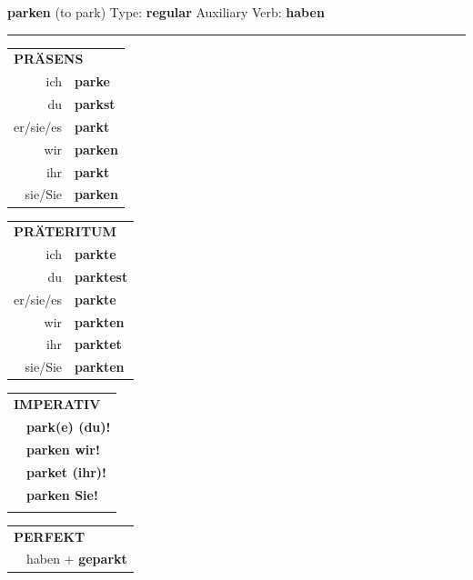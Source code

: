 \documentclass[10pt,a4paper]{revtex4-2}
\begin{document}
\begin{verbbox}
    {\Large \bf parken} (to park) \hfill Type: \textbf{regular} \hfill Auxiliary Verb: \textbf{haben} 
    
     \vspace{5pt}

    \hrule
    
    \vspace{5pt}

  \begin{tabular}{rl}
     \multicolumn{2}{l}{\textbf{PRÄSENS} }\\
    ich & \textbf{parke}\\
    du & \textbf{parkst}\\
    er/sie/es & \textbf{parkt}\\
    wir & \textbf{parken}\\
    ihr & \textbf{parkt}\\
    sie/Sie & \textbf{parken}\\
  \end{tabular}
  \hfill
     \begin{tabular}{rl}
    \multicolumn{2}{l}{\textbf{PRÄTERITUM} }\\
    ich & \textbf{parkte}\\
    du & \textbf{parktest}\\
    er/sie/es & \textbf{parkte}\\
    wir & \textbf{parkten}\\
    ihr & \textbf{parktet}\\
    sie/Sie & \textbf{parkten}\\
  \end{tabular}
  \hfill
  \begin{tabular}{rl}
     \multicolumn{2}{l}{\textbf{IMPERATIV} }\\
   & \textbf{park(e) (du)!}\\
   & \textbf{parken wir!}\\
   & \textbf{parket (ihr)!}\\
   & \textbf{parken Sie!}\\
   & \vspace{10pt}
  \end{tabular}

    \vspace{10pt}

 \begin{tabular}{rl}
     \multicolumn{2}{l}{\textbf{PERFEKT}}\\
  &  haben + \textbf{geparkt}\\
  \end{tabular}
\hfill
   \begin{tabular}{rl}
   

\end{tabular}
\end{verbbox}
\end{document}

